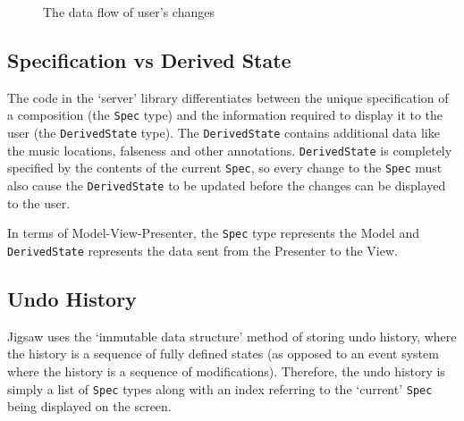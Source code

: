 \documentclass[12pt]{article}
\begin{document}
\begin{figure}
    \caption{The data flow of user's changes}\label{fig:app-data-flow}
\end{figure}

\subsection{Specification vs Derived State}

The code in the `server' library differentiates between the unique specification of a composition
(the \verb|Spec| type) and the information required to display it to the user (the
\verb|DerivedState| type).  The \verb|DerivedState| contains additional data like the music
locations, falseness and other annotations.  \verb|DerivedState| is completely specified by the contents of the
current \verb|Spec|, so every change to the \verb|Spec| must also cause the \verb|DerivedState| to
be updated before the changes can be displayed to the user.

In terms of Model-View-Presenter, the \verb|Spec| type represents the Model and \verb|DerivedState|
represents the data sent from the Presenter to the View.

\subsection{Undo History}

Jigsaw uses the `immutable data structure' method of storing undo history, where the history is a
sequence of fully defined states (as opposed to an event system where the history is a sequence of
modifications).  Therefore, the undo history is simply a list of \verb|Spec| types along with an
index referring to the `current' \verb|Spec| being displayed on the screen.
\end{document}
